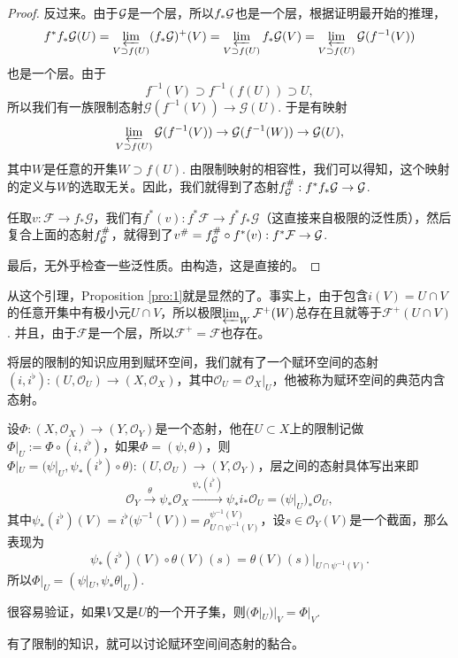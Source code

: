 \begin{proof}
	反过来。由于$\mathcal{G}$是一个层，所以$f_*\mathcal{G}$也是一个层，根据证明最开始的推理，
	\[
		f^*f_*\mathcal{G}(U)=\varprojlim_{V\supset f(U)} (f_*\mathcal{G})^+(V)=\varprojlim_{V\supset f(U)} f_*\mathcal{G}(V)=\varprojlim_{V\supset f(U)} \mathcal{G}(f^{-1}(V))
	\]
	也是一个层。由于
	\[
	f^{-1}(V)\supset f^{-1}(f(U))\supset U,
	\]
	所以我们有一族限制态射$\mathcal{G}(f^{-1}(V))\to \mathcal{G}(U)$. 于是有映射
	\[
	\varprojlim_{V\supset f(U)} \mathcal{G}(f^{-1}(V))\to \mathcal{G}(f^{-1}(W))\to \mathcal{G}(U),
	\]
	其中$W$是任意的开集$W\supset f(U)$. 由限制映射的相容性，我们可以得知，这个映射的定义与$W$的选取无关。因此，我们就得到了态射$f^\#_{\mathcal{G}}:f^*f_*\mathcal{G}\to \mathcal{G}$.

	任取$v:\mathcal{F}\to f_*\mathcal{G}$，我们有$f^*(v):f^*\mathcal{F}\to f^*f_*\mathcal{G}$（这直接来自极限的泛性质），然后复合上面的态射$f^\#_{\mathcal{G}}$，就得到了$v^\#=f^\#_{\mathcal{G}}\circ f^*(v):f^*\mathcal{F}\to \mathcal{G}$.

	最后，无外乎检查一些泛性质。由构造，这是直接的。
\end{proof}

从这个引理，Proposition \ref{pro:1}就是显然的了。事实上，由于包含$i(V)=U\cap V$的任意开集中有极小元$U\cap V$，所以极限$\varprojlim_W \mathcal{F}^+(W)$总存在且就等于$\mathcal{F}^+(U\cap V)$. 并且，由于$\mathcal{F}$是一个层，所以$\mathcal{F}^+=\mathcal{F}$也存在。

\begin{para}
将层的限制的知识应用到赋环空间，我们就有了一个赋环空间的态射$(i,i^\flat):(U,\mathcal{O}_U)\to (X,\mathcal{O}_X)$，其中$\mathcal{O}_U=\mathcal{O}_X|_U$，他被称为赋环空间的典范内含态射。

设$\Phi:(X,\mathcal{O}_X)\to (Y,\mathcal{O}_Y)$是一个态射，他在$U\subset X$上的限制记做$\Phi|_U:=\Phi\circ (i,i^\flat)$，如果$\Phi=(\psi,\theta)$，则$\Phi|_U=\bigl(\psi|_U, \psi_*(i^\flat) \circ \theta\bigr):(U,\mathcal{O}_U)\to (Y,\mathcal{O}_Y)$，层之间的态射具体写出来即
\[
	\mathcal{O}_Y\xrightarrow{\theta} \psi_*\mathcal{O}_X \xrightarrow{\psi_*(i^\flat)} \psi_*i_*\mathcal{O}_U=\bigl(\psi|_U\bigr)_*\mathcal{O}_U,
\]
其中$\psi_*(i^\flat)(V)=i^\flat\bigl(\psi^{-1}(V)\bigr)=\rho^{\psi^{-1}(V)}_{U\cap \psi^{-1}(V)}$，设$s\in \mathcal{O}_Y(V)$是一个截面，那么表现为
\[
	\psi_*(i^\flat)(V)\circ \theta(V)(s)=\theta(V)(s)|_{U\cap \psi^{-1}(V)}.
\]
所以$\Phi|_U=(\psi|_U,\psi_*\theta|_U)$.

很容易验证，如果$V$又是$U$的一个开子集，则$(\Phi|_U)|_V=\Phi|_V$.
\end{para}

有了限制的知识，就可以讨论赋环空间间态射的黏合。

